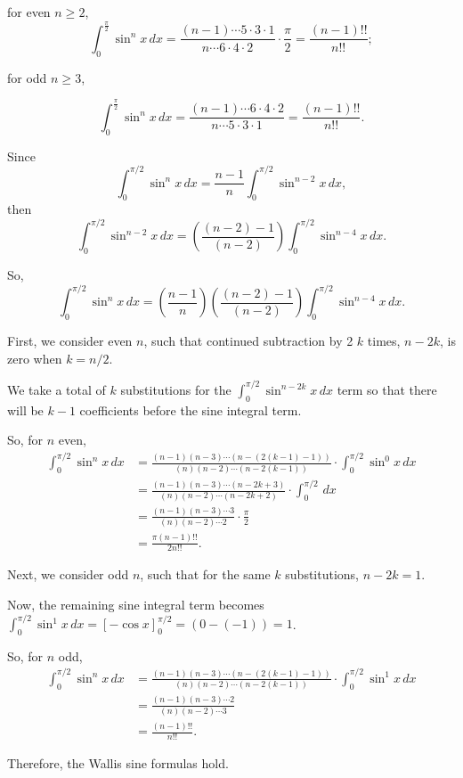 \documentclass[../hw8]{subfiles}
\begin{document}
for even $n\geq2$, 
\[\int_{0}^{\frac{\pi}{2}} \sin^n{x}\,dx = \frac{(n-1)\cdots5\cdot3\cdot1}{n\cdots6\cdot4\cdot2}\cdot\frac{\pi}{2}=\frac{(n-1)!!}{n!!};\]

for odd $n\geq3$,

\[\int_{0}^{\frac{\pi}{2}} \sin^n{x}\,dx = \frac{(n-1)\cdots6\cdot4\cdot2}{n\cdots5\cdot3\cdot1}=\frac{(n-1)!!}{n!!}.\]

Since \[\int_{0}^{\pi/2} \sin^n{x}\,dx = \frac{n-1}{n} \int_{0}^{\pi/2} \sin^{n-2}{x}\,dx,\] then \[\int_{0}^{\pi/2} \sin^{n-2}{x}\,dx = \left( \frac{(n-2)-1}{(n-2)} \right)\int_{0}^{\pi/2} \sin^{n-4}{x}\,dx.\]

So, \[\int_{0}^{\pi/2} \sin^n{x}\,dx = \left( \frac{n-1}{n} \right)\left( \frac{(n-2)-1}{(n-2)} \right)\int_{0}^{\pi/2} \sin^{n-4}{x}\,dx.\]

First, we consider even $n$, such that continued subtraction by 2 $k$ times, $n-2k$, is zero when $k=n/2$. 

We take a total of $k$ substitutions for the $\int_{0}^{\pi/2} \sin^{n-2k}{x}\,dx$ term so that there will be $k-1$ coefficients before the sine integral term.

So, for $n$ even,
\begin{align*}
    \int_{0}^{\pi/2}\sin^n{x}\,dx &= \frac{(n-1)(n-3)\cdots(n-(2(k-1)-1))}{(n)(n-2)\cdots(n-2(k-1))} \cdot \int_{0}^{\pi/2} \sin^{0}{x}\,dx \\
    &= \frac{(n-1)(n-3)\cdots(n-2k+3)}{(n)(n-2)\cdots(n-2k+2)} \cdot \int_{0}^{\pi/2} \,dx \\
    &= \frac{(n-1)(n-3)\cdots3}{(n)(n-2)\cdots2} \cdot \frac{\pi}{2} \\
    &= \frac{\pi (n-1)!!}{2 n!!}.
\end{align*}

Next, we consider odd $n$, such that for the same $k$ substitutions, $n-2k=1$. 

Now, the remaining sine integral term becomes $\int_{0}^{\pi/2} \sin^1{x}\,dx=[-\cos{x}]_{0}^{\pi/2}=(0-(-1))=1$.

So, for $n$ odd,
\begin{align*}
    \int_{0}^{\pi/2}\sin^n{x}\,dx &= \frac{(n-1)(n-3)\cdots(n-(2(k-1)-1))}{(n)(n-2)\cdots(n-2(k-1))} \cdot \int_{0}^{\pi/2} \sin^1{x}\,dx \\
    &= \frac{(n-1)(n-3)\cdots2}{(n)(n-2)\cdots3} \\
    &= \frac{(n-1)!!}{n!!}.
\end{align*}

Therefore, the Wallis sine formulas hold.
\end{document}
